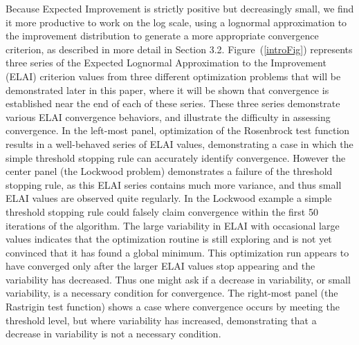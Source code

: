 \documentclass[12pt]{article}
\begin{document}
Because Expected Improvement is strictly positive but decreasingly small,
we find it more productive to work on the log scale, using a lognormal
approximation to the improvement distribution to generate a more appropriate convergence criterion, as described in more
detail in Section 3.2.
%
Figure~(\ref{introFig}) represents three series of the Expected
Lognormal Approximation to the Improvement (ELAI) criterion values from three
different optimization problems that will be demonstrated later in
this paper, where it will be shown that convergence is established near
the end of each of these series.
These three series demonstrate various ELAI convergence behaviors, and
illustrate the difficulty in assessing convergence.  
%
In the left-most panel, optimization of the Rosenbrock test function 
results in a well-behaved series of ELAI values, demonstrating a case in 
which the simple threshold stopping rule can accurately identify convergence.
However the center panel (the Lockwood problem) demonstrates a failure of 
the threshold stopping rule, as this ELAI series contains much more 
variance, and thus small ELAI values are observed quite regularly.
In the Lockwood example a simple threshold stopping rule could falsely
claim convergence within the first 50 iterations of the algorithm.
%
The large variability in ELAI with occasional large values indicates that 
the optimization routine is still exploring and is not yet convinced that 
it has found a global minimum.
This optimization run appears to have converged only after the
larger ELAI values stop appearing and the variability has decreased.
%
Thus one might ask if a decrease in variability, or small variability,
is a necessary condition for convergence.  
%
The right-most panel (the Rastrigin test function) 
shows a case where convergence occurs by meeting the threshold level,
but where variability has increased, demonstrating that a decrease in
variability is not a necessary condition.
\end{document}
